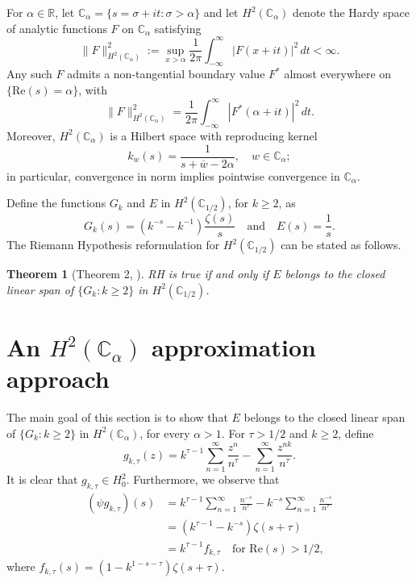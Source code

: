 \documentclass[11pt]{extarticle}
\numberwithin{equation}{section}
\theoremstyle{plain}
\newtheorem{theorem}{Theorem}[section]
\theoremstyle{definition}
\begin{document}
For $\alpha \in \mathbb{R}$, let $\mathbb{C}_\alpha = \{s = \sigma + it : \sigma > \alpha\}$ and let $H^2(\mathbb{C}_\alpha)$ denote the Hardy space of analytic functions $F$ on $\mathbb{C}_\alpha$ satisfying
\[
\|F\|^2_{H^2(\mathbb{C}_\alpha)} := \sup_{x > \alpha} \frac{1}{2\pi} \int_{-\infty}^{\infty} |F(x + it)|^2 \, dt < \infty.
\]
Any such $F$ admits a non-tangential boundary value $F^*$ almost everywhere on $\{\mathrm{Re}(s) = \alpha\}$, with
\[
\|F\|^2_{H^2(\mathbb{C}_\alpha)} = \frac{1}{2\pi}\int_{-\infty}^{\infty} |F^*(\alpha + it)|^2 \, dt.
\]
Moreover, $H^2(\mathbb{C}_\alpha)$ is a Hilbert space with reproducing kernel
\[
k_w(s) = \frac{1}{s + \overline{w} - 2\alpha}, \quad w \in \mathbb{C}_\alpha;
\]
in particular, convergence in norm implies pointwise convergence in $\mathbb{C}_\alpha$. 

Define the functions $G_k$ and $E$ in $H^2(\mathbb{C}_{1/2})$, for $k \geq 2$, as
\[
G_k(s) = (k^{-s} - k^{-1})\frac{\zeta(s)}{s} \quad \text{and} \quad E(s) = \frac{1}{s}.
\]
The Riemann Hypothesis reformulation for $H^2(\mathbb{C}_{1/2})$ can be stated as follows.

\begin{theorem}[Theorem 2, \cite{bagchi}]
RH is true if and only if $E$ belongs to the closed linear span of $\{G_k : k \geq 2\}$ in $H^2(\mathbb{C}_{1/2})$.
\end{theorem}

\section{An $H^2(\mathbb{C}_\alpha)$ approximation approach}

The main goal of this section is to show that $E$ belongs to the closed linear span 
of $\{G_k : k \geq 2\}$ in $H^2(\mathbb{C}_\alpha)$, for every $\alpha > 1$. 
For $\tau > 1/2$ and $k \geq 2$, define
\[
g_{k,\tau}(z) = k^{\tau-1}\sum_{n=1}^{\infty}\frac{z^n}{n^\tau} - \sum_{n=1}^{\infty}\frac{z^{nk}}{n^\tau}.
\]
It is clear that $g_{k,\tau} \in H^2_0$. Furthermore, we observe that
\begin{align*}
(\psi g_{k,\tau})(s) &= k^{\tau-1}\sum_{n=1}^{\infty}\frac{n^{-s}}{n^\tau} - k^{-s}\sum_{n=1}^{\infty}\frac{n^{-s}}{n^\tau}\\
&= (k^{\tau-1} - k^{-s})\zeta(s+\tau)\\
&= k^{\tau-1}f_{k,\tau} \quad \text{for } \mathrm{Re}(s) > 1/2,
\end{align*}
where $f_{k,\tau}(s) = (1 - k^{1-s-\tau})\zeta(s+\tau)$.
\end{document}
